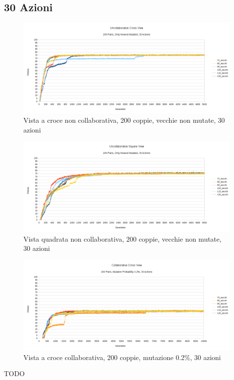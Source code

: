 \clearpage

\subsection{30 Azioni}
\begin{figure}[ht]
	\centering
	\includegraphics[scale=0.7,angle=90]{imgs/cross_nc_200_pairs_70_120_old_not_mutated_30_actions.png}
	\caption{Vista a croce non collaborativa, 200 coppie, vecchie non mutate, 30 azioni}
	\label{figure:cross_nc_200_70_120_non_30_actions}
\end{figure}
\begin{figure}[ht]
	\centering
	\includegraphics[scale=0.7,angle=90]{imgs/square_nc_200_pairs_70_120_old_not_mutated_30_actions.png}
	\caption{Vista quadrata non collaborativa, 200 coppie, vecchie non mutate, 30 azioni}
	\label{figure:square_nc_200_70_120_non_30_actions}
\end{figure}
\begin{figure}[ht]
	\centering
	\includegraphics[scale=0.7,angle=90]{imgs/cross_c_200_pairs_70_120_old_02_mutation_30_actions.png}
	\caption{Vista a croce collaborativa, 200 coppie, mutazione 0.2\%, 30 azioni}
	\label{figure:cross_c_200_70_120_mutation_02_30_actions}
\end{figure}
TODO
